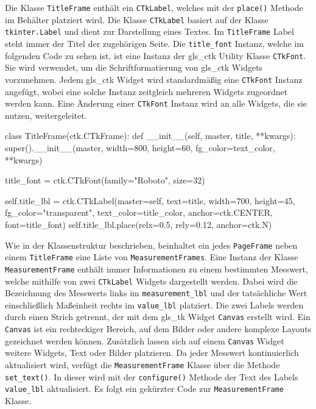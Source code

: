 Die Klasse \lstinline{TitleFrame} enthält ein \lstinline{CTkLabel}, welches mit der \lstinline{place()} Methode im Behälter platziert wird. Die Klasse \lstinline{CTkLabel} basiert auf der Klasse \lstinline{tkinter.Label} und dient zur Darstellung eines Textes. Im \lstinline{TitleFrame} Label steht immer der Titel der zugehörigen Seite. Die \lstinline{title_font} Instanz, welche im folgenden Code zu sehen ist, ist eine Instanz der \gls{gls_ctk} Utility Klasse \lstinline{CTkFont}. Sie wird verwendet, um die Schriftformatierung von \gls{gls_ctk} Widgets vorzunehmen. Jedem \gls{gls_ctk} Widget wird standardmäßig eine \lstinline{CTkFont} Instanz angefügt, wobei eine solche Instanz zeitgleich mehreren Widgets zugeordnet werden kann. Eine Änderung einer \lstinline{CTkFont} Instanz wird an alle Widgets, die sie nutzen, weitergeleitet. \cite[vgl.][]{Schimansky:o.J.}

\begin{pythoncode}
class TitleFrame(ctk.CTkFrame):
	def __init__(self, master, title, **kwargs):
		super().__init__(master, width=800, height=60, fg_color=text_color, **kwargs)
		
		title_font = ctk.CTkFont(family="Roboto", size=32)
		
		self.title_lbl = ctk.CTkLabel(master=self, text=title, width=700, height=45, fg_color="transparent", text_color=title_color, anchor=ctk.CENTER, font=title_font)
		self.title_lbl.place(relx=0.5, rely=0.12, anchor=ctk.N)
\end{pythoncode}


Wie in der Klassenstruktur beschrieben, beinhaltet ein jedes \lstinline{PageFrame} neben einem \lstinline{TitleFrame} eine Liste von \lstinline{MeasurementFrames}. Eine Instanz der Klasse \lstinline{MeasurementFrame} enthält immer Informationen zu einem bestimmten Messwert, welche mithilfe von zwei \lstinline{CTkLabel} Widgets dargestellt werden. Dabei wird die Bezeichnung des Messwerts links im \lstinline{measurement_lbl} und der tatsächliche Wert einschließlich Maßeinheit rechts im \lstinline{value_lbl} platziert. Die zwei Labels werden durch einen Strich getrennt, der mit dem \gls{gls_tk} Widget \lstinline{Canvas} erstellt wird. Ein \lstinline{Canvas} ist ein rechteckiger Bereich, auf dem Bilder oder andere komplexe Layouts gezeichnet werden können. Zusätzlich lassen sich auf einem \lstinline{Canvas} Widget \zB weitere Widgets, Text oder Bilder platzieren. \cite[vgl.][20]{Shipman:2013} 
\newline Da jeder Messwert kontinuierlich aktualisiert wird, verfügt die \lstinline{MeasurementFrame} Klasse über die Methode \lstinline{set_text()}. In dieser wird mit der \lstinline{configure()} Methode der Text des Labels \lstinline{value_lbl} aktualisiert. Es folgt ein gekürzter Code zur \lstinline{MeasurementFrame} Klasse.

